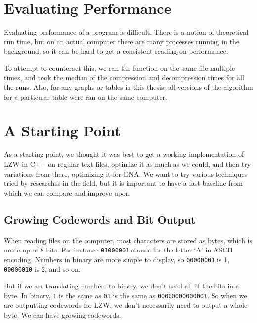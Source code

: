 \documentclass[12pt,twoside]{reedthesis}
\begin{document}
\hypertarget{evaluating-performance}{%
\section{Evaluating Performance}\label{evaluating-performance}}

Evaluating performance of a program is difficult. There is a notion of theoretical run time, but on an actual computer there are many processes running in the background, so it can be hard to get a consistent reading on performance.

To attempt to counteract this, we ran the function on the same file multiple times, and took the median of the compression and decompression times for all the runs. Also, for any graphs or tables in this thesis, all versions of the algorithm for a particular table were ran on the same computer.

\hypertarget{a-starting-point}{%
\section{A Starting Point}\label{a-starting-point}}

As a starting point, we thought it was best to get a working implementation of LZW in C++ on regular text files, optimize it as much as we could, and then try variations from there, optimizing it for DNA. We want to try various techniques tried by researches in the field, but it is important to have a fast baseline from which we can compare and improve upon.

\hypertarget{growing-codewords-and-bit-output}{%
\subsection{Growing Codewords and Bit Output}\label{growing-codewords-and-bit-output}}

When reading files on the computer, most characters are stored as bytes, which is made up of 8 bits. For instance \texttt{01000001} stands for the letter `A' in ASCII encoding. Numbers in binary are more simple to display, so \texttt{00000001} is 1, \texttt{00000010} is 2, and so on.

But if we are translating numbers to binary, we don't need all of the bits in a byte. In binary, \texttt{1} is the same as \texttt{01} is the same as \texttt{00000000000001}. So when we are outputting codewords for LZW, we don't necessarily need to output a whole byte. We can have growing codewords.
\end{document}
